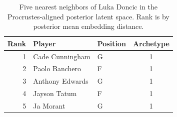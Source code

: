 \begin{table}[htbp]
  \centering\small
  \begin{tabular}{rllc}
    \toprule
    Rank & Player & Position & Archetype \\
    \midrule
    1 & Cade Cunningham & G & 1 \\
    2 & Paolo Banchero & F & 1 \\
    3 & Anthony Edwards & G & 1 \\
    4 & Jayson Tatum & F & 1 \\
    5 & Ja Morant & G & 1 \\
    \bottomrule
  \end{tabular}
  \caption{Five nearest neighbors of Luka Doncic in the Procrustes-aligned posterior latent space. Rank is by posterior mean embedding distance.}
  \label{tab:Luka_Doncic_neighbors}
\end{table}

